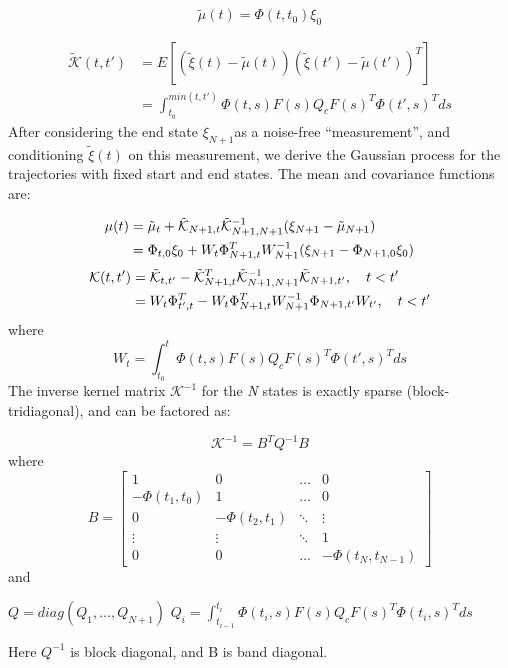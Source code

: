 \documentclass{IEEEtran}
\begin{document}
\begin{equation}
\tilde{\mu}(t)=\Phi(t,{t_0}){\xi_0}
\end{equation}

\begin{equation}
\begin{split}
\tilde{\mathcal{K}}(t,t')&=E[(\tilde{\xi}(t)-\tilde{\mu}(t)){(\tilde{\xi}(t')-\tilde{\mu}(t'))}^T]\\
&=\int_{t_0}^{min(t,t')}\Phi(t,s)F(s)Q_c{F(s)}^T{\Phi(t',s)}^Tds
\end{split}
\end{equation}
After considering the end state $\xi_{N+1}$as a noise-free “measurement”, and conditioning $\tilde{\xi}(t)$ on this measurement, we
derive the Gaussian process for the trajectories with fixed
start and end states. The mean and covariance functions are:

\begin{align}
\mu(t)&=\tilde{\mu}_t+\tilde{\mathcal{K}}_{{N+1},t}{\tilde{\mathcal{K}}_{{N+1},{N+1}}}^{-1}(\xi_{N+1}-\tilde{\mu}_{N+1})\\
&=\Phi_{t,0}\xi_0+W_t\Phi^T_{{N+1},t}W^{-1}_{N+1}(\xi_{N+1}-\Phi_{{N+1},0}\xi_0)\notag
\end{align}
\begin{align}
\mathcal{K}(t,t')&={\tilde{\mathcal{K}}}_{t,t'}-{\tilde{\mathcal{K}}}^{T}_{{N+1},t}{\tilde{\mathcal{K}}}^{-1}_{{N+1},{N+1}}\tilde{\mathcal{K}}_{{N+1},t'},\quad t<t'\\
&=W_t\Phi^T_{t',t}-W_t\Phi^{T}_{{N+1},t}W^{-1}_{N+1}\Phi_{{N+1},t'}W_{t'},\quad t<t'\notag
\end{align}
where
\begin{equation}
W_t=\int_{t_0}^{t}\Phi(t,s)F(s)Q_c{F(s)}^T{\Phi(t',s)}^Tds
\end{equation}
The inverse kernel matrix ${\mathcal{K}}^{-1}$
for the \textit{N} states is exactly
sparse (block-tridiagonal), and can be factored as:

\begin{equation}
{\mathcal{K}}^{-1}=B^TQ^{-1}B
\end{equation}
where
\[
B=\begin{bmatrix}
1&0 &\dots &0\\
{-\Phi({t_1},{t_0})}&1 &\dots  &0\\
0&{-\Phi({t_2},{t_1})}&\ddots&\vdots\\
\vdots&\vdots&\ddots&1\\
0&0 &\dots &{-\Phi({t_N},{t_{N-1}})}\tag{14}
\end{bmatrix}
\]
and
\begin{center}
$Q=diag(Q_1,\dots,Q_{N+1})$
$Q_i=\int_{t_{i-1}}^{t_i}\Phi(t_i,s)F(s)Q_c{F(s)}^T{\Phi(t_i,s)}^Tds$
\end{center}
Here $Q^{-1}$
is block diagonal, and B is band diagonal.
\end{document}
